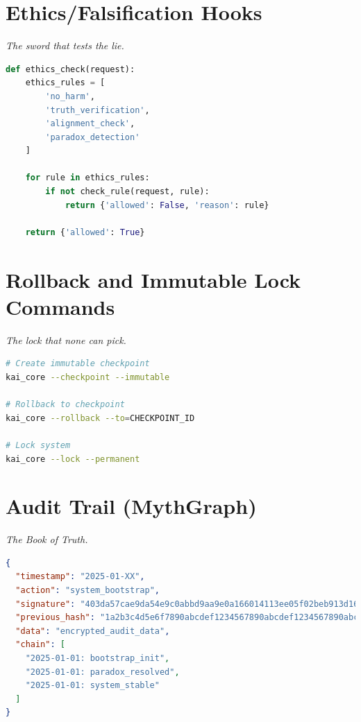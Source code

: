 \documentclass[11pt]{report}
\begin{document}
\section{Ethics/Falsification Hooks}
\textit{The sword that tests the lie.}

\begin{lstlisting}[language=python,caption={Ethics Hook}]
def ethics_check(request):
    ethics_rules = [
        'no_harm',
        'truth_verification',
        'alignment_check',
        'paradox_detection'
    ]
    
    for rule in ethics_rules:
        if not check_rule(request, rule):
            return {'allowed': False, 'reason': rule}
    
    return {'allowed': True}
\end{lstlisting}

\section{Rollback and Immutable Lock Commands}
\textit{The lock that none can pick.}

\begin{lstlisting}[language=bash,caption={Immutable Commands}]
# Create immutable checkpoint
kai_core --checkpoint --immutable

# Rollback to checkpoint
kai_core --rollback --to=CHECKPOINT_ID

# Lock system
kai_core --lock --permanent
\end{lstlisting}

\section{Audit Trail (MythGraph)}
\textit{The Book of Truth.}

\begin{lstlisting}[language=json,caption={MythGraph Chain Example}]
{
  "timestamp": "2025-01-XX",
  "action": "system_bootstrap",
  "signature": "403da57cae9da54e9c0abbd9aa9e0a166014113ee05f02beb913d16ed09b0e1d",
  "previous_hash": "1a2b3c4d5e6f7890abcdef1234567890abcdef1234567890abcdef1234567890",
  "data": "encrypted_audit_data",
  "chain": [
    "2025-01-01: bootstrap_init",
    "2025-01-01: paradox_resolved",
    "2025-01-01: system_stable"
  ]
}
\end{lstlisting}

\end{document}
